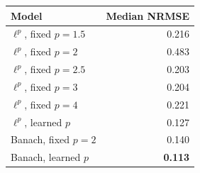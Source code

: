\begin{tabular}{lr}
\toprule
Model & Median NRMSE \\
\midrule
$\ell^p$, fixed $p=1.5$ & 0.216 \\
$\ell^p$, fixed $p=2$ & 0.483 \\
$\ell^p$, fixed $p=2.5$ & 0.203 \\
$\ell^p$, fixed $p=3$ & 0.204 \\
$\ell^p$, fixed $p=4$ & 0.221 \\
$\ell^p$, learned $p$ & 0.127 \\
Banach, fixed $p=2$ & 0.140 \\
Banach, learned $p$ & \textbf{0.113} \\
\bottomrule
\end{tabular}
